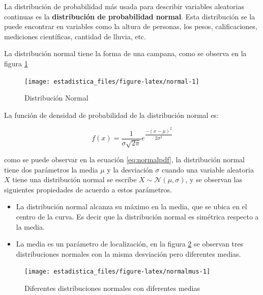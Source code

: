 \documentclass[]{book}
\providecommand{\tightlist}{%
  \setlength{\itemsep}{0pt}\setlength{\parskip}{0pt}}
\begin{document}
La distribución de probabilidad más usada para describir variables aleatorias continuas es la \textbf{distribución de probabilidad normal}. Esta distribución se la puede encontrar en variables como la altura de personas, los pesos, calificaciones, mediciones científicas, cantidad de lluvia, etc.

La distribución normal tiene la forma de una campana, como se observa en la figura \ref{fig:normal}

\begin{figure}[h]

{\centering \texttt{[image: estadistica\_files/figure-latex/normal-1]} 

}

\caption{Distribución Normal}\label{fig:normal}
\end{figure}

La función de densidad de probabilidad de la distribución normal es:

\begin{equation} 
f\left(x\right)=\dfrac{1}{\sigma\sqrt{2\pi}}e^{\dfrac{-\left(x-\mu\right)^2}{2\sigma^2}}
\label{eq:normalpdf}
\end{equation}

como se puede observar en la ecuación \eqref{eq:normalpdf}, la distribución normal tiene dos parámetros la media \(\mu\) y la desviación \(\sigma\) cuando una variable aleatoria \(X\) tiene una distribución normal se escribe \(X \sim \mathcal{N}\left(\mu,\sigma \right)\), y se observan las siguientes propiedades de acuerdo a estos parámetros.

\begin{itemize}
\tightlist
\item
  La distribución normal alcanza su máximo en la media, que se ubica en el centro de la curva. Es decir que la distribución normal es simétrica respecto a la media.
\item
  La media es un parámetro de localización, en la figura \ref{fig:normalmus} se observan tres distribuciones normales con la misma desviación pero diferentes medias.
\end{itemize}

\begin{figure}[h]

{\centering \texttt{[image: estadistica\_files/figure-latex/normalmus-1]} 

}

\caption{Diferentes distribuciones normales con diferentes medias}\label{fig:normalmus}
\end{figure}
\end{document}
